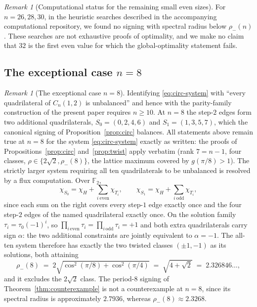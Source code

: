\documentclass[11pt]{article}
\theoremstyle{remark}
\newtheorem{remark}[lemma]{Remark}
\newcommand{\F}{\mathbb{F}}
\begin{document}
\begin{remark}[Computational status for the remaining small even sizes]
For $n=26,28,30$, in the heuristic searches described in the
accompanying computational repository, we found no signing with
spectral radius below $\rho_-(n)$. These searches are not exhaustive
proofs of optimality, and we make no claim that $32$ is the first even
value for which the global-optimality statement fails.
\end{remark}

\subsection{\texorpdfstring{The exceptional case $n=8$}{The exceptional case n=8}}

\begin{remark}[The exceptional case $n=8$]\label{rem:n8}
Identifying \eqref{eq:circ-system} with ``every quadrilateral of $C_n(1,2)$ is
unbalanced'' and hence with the parity-family construction of the present paper
requires $n\ge10$. At $n=8$ the step-$2$ edges form two additional
quadrilaterals, $S_0=(0,2,4,6)$ and $S_1=(1,3,5,7)$, which the
canonical signing of Proposition~\ref{prop:circ} balances. All
statements above remain true at $n=8$ for the system \eqref{eq:circ-system}
exactly as written: the proofs of Propositions~\ref{prop:circ}
and~\ref{prop:twist} apply verbatim (rank $7=n-1$, four classes,
$\rho\in\{2\sqrt2,\rho_-(8)\}$, the lattice maximum covered by
$g(\pi/8)>1$). The strictly larger system requiring all ten
quadrilaterals to be unbalanced is resolved by a flux computation.
Over $\F_2$,
\[
\chi_{S_0}=\chi_H+\!\!\sum_{i\ \mathrm{even}}\!\chi_{T_i},\qquad
\chi_{S_1}=\chi_H+\!\!\sum_{i\ \mathrm{odd}}\!\chi_{T_i},
\]
since each sum on the right covers every step-$1$ edge exactly once
and the four step-$2$ edges of the named quadrilateral exactly once.
On the solution family $\tau_i=\tau_0(-1)^i$, so
$\prod_{i\,\mathrm{even}}\tau_i=\prod_{i\,\mathrm{odd}}\tau_i=+1$ and
both extra quadrilaterals carry sign $\alpha$: the two additional
constraints are jointly equivalent to $\alpha=-1$. The all-ten system
therefore has exactly the two twisted classes $(\pm1,-1)$ as its
solutions, both attaining
\[
\rho_-(8)\;=\;2\sqrt{\cos^2(\pi/8)+\cos^2(\pi/4)}\;=\;\sqrt{4+\sqrt2}
\;=\;2.326846\ldots,
\]
and it excludes the $2\sqrt2$ class. The period-$8$ signing of
Theorem~\ref{thm:counterexample} is not a counterexample at $n=8$, since
its spectral radius is approximately $2.7936$, whereas
$\rho_-(8)\approx2.3268$.
\end{remark}
\end{document}
